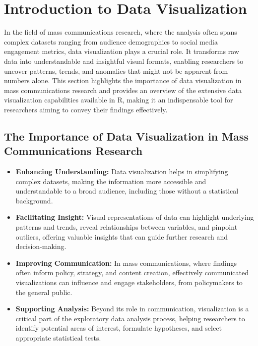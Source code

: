\documentclass[
]{book}
\begin{document}
\section{Introduction to Data Visualization}\label{introduction-to-data-visualization}

In the field of mass communications research, where the analysis often spans complex datasets ranging from audience demographics to social media engagement metrics, data visualization plays a crucial role. It transforms raw data into understandable and insightful visual formats, enabling researchers to uncover patterns, trends, and anomalies that might not be apparent from numbers alone. This section highlights the importance of data visualization in mass communications research and provides an overview of the extensive data visualization capabilities available in R, making it an indispensable tool for researchers aiming to convey their findings effectively.

\subsection*{The Importance of Data Visualization in Mass Communications Research}\label{the-importance-of-data-visualization-in-mass-communications-research}

\begin{itemize}
\item
  \textbf{Enhancing Understanding:} Data visualization helps in simplifying complex datasets, making the information more accessible and understandable to a broad audience, including those without a statistical background.
\item
  \textbf{Facilitating Insight:} Visual representations of data can highlight underlying patterns and trends, reveal relationships between variables, and pinpoint outliers, offering valuable insights that can guide further research and decision-making.
\item
  \textbf{Improving Communication:} In mass communications, where findings often inform policy, strategy, and content creation, effectively communicated visualizations can influence and engage stakeholders, from policymakers to the general public.
\item
  \textbf{Supporting Analysis:} Beyond its role in communication, visualization is a critical part of the exploratory data analysis process, helping researchers to identify potential areas of interest, formulate hypotheses, and select appropriate statistical tests.
\end{itemize}
\end{document}
